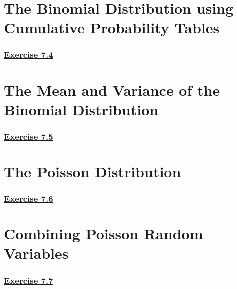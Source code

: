\documentclass[
  11pt,
]{book}
\begin{document}
\section{The Binomial Distribution using Cumulative Probability Tables}\label{the-binomial-distribution-using-cumulative-probability-tables}

\subsubsection*{\texorpdfstring{\hyperref[ex74a]{Exercise 7.4}}{Exercise 7.4}}\label{exercise-7.4}

\section{The Mean and Variance of the Binomial Distribution}\label{the-mean-and-variance-of-the-binomial-distribution}

\subsubsection*{\texorpdfstring{\hyperref[ex75a]{Exercise 7.5}}{Exercise 7.5}}\label{exercise-7.5}

\section{The Poisson Distribution}\label{the-poisson-distribution}

\subsubsection*{\texorpdfstring{\hyperref[ex76a]{Exercise 7.6}}{Exercise 7.6}}\label{exercise-7.6}

\section{Combining Poisson Random Variables}\label{combining-poisson-random-variables}

\subsubsection*{\texorpdfstring{\hyperref[ex77a]{Exercise 7.7}}{Exercise 7.7}}\label{exercise-7.7}
\end{document}
